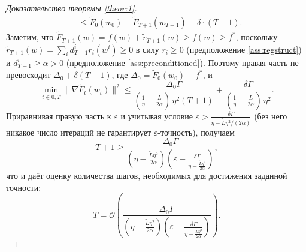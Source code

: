 \begin{proof}[Доказательство теоремы \ref{theor:1}]
\begin{equation*}
\begin{split}
    & \leq \widetilde{F}_0(w_0) - \widetilde{F}_{T+1}(w_{T+1}) + \delta \cdot (T+1).
\end{split}
\end{equation*}
Заметим, что $\widetilde{F}_{T+1}(w) = f(w) + \widetilde{r}_{T+1}(w) \ge f(w) \ge f^*$, поскольку $\widetilde{r}_{T+1}(w) = \sum_i d_{T+1}^i r_i(w^i) \ge 0$ в силу $r_i \ge 0$ (предположение \ref{ass:regstruct}) и $d_{T+1}^i \ge \alpha > 0$ (предположение \ref{ass:preconditioned}). Поэтому правая часть не превосходит $\Delta_0 + \delta(T+1)$, где $\Delta_0 = \widetilde{F}_0(w_0) - f^*$, и
\begin{equation*}
    \min_{t \in \overline{0, T}} \|\nabla \widetilde{F}_t(w_t)\|^2 \leq \frac{\Delta_0 \Gamma}{(\frac{1}{\eta} - \frac{\widetilde{L}}{2\alpha})\, \eta^2 (T+1)} + \frac{\delta \Gamma}{(\frac{1}{\eta} - \frac{\widetilde{L}}{2\alpha})\, \eta^2}.
\end{equation*}
Приравнивая правую часть к $\varepsilon$ и учитывая условие $\varepsilon > \frac{\delta\Gamma}{\eta - \widetilde{L}\eta^2/(2\alpha)}$ (без него никакое число итераций не гарантирует $\varepsilon$-точность), получаем
\begin{equation*}
    T + 1 \geq \frac{\Delta_0 \Gamma}{(\eta - \frac{\widetilde{L}\eta^2}{2\alpha}) \left( \varepsilon -\frac{\delta\Gamma}{\eta - \frac{\widetilde{L}\eta^2}{2\alpha}}\right)},
\end{equation*}
что и даёт оценку количества шагов, необходимых для достижения заданной точности:
\begin{equation*}
      T = \mathcal{O}\left( \frac{\Delta_0 \Gamma}{(\eta - \frac{\widetilde{L}\eta^2}{2\alpha}) \left( \varepsilon -\frac{\delta\Gamma}{\eta - \frac{\widetilde{L}\eta^2}{2\alpha}}\right)} \right).
\end{equation*}
\end{proof}


